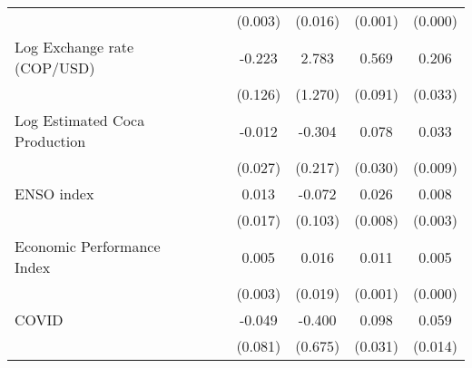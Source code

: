 \begin{tabular}{lcccccccc}
                    &                     &                     &                     &                     &     (0.003)         &     (0.016)         &     (0.001)         &     (0.000)         \\
\addlinespace
Log Exchange rate (COP/USD)&                     &                     &                     &                     &      -0.223         &       2.783\sym{*}  &       0.569\sym{***}&       0.206\sym{***}\\
                    &                     &                     &                     &                     &     (0.126)         &     (1.270)         &     (0.091)         &     (0.033)         \\
\addlinespace
Log Estimated Coca Production&                     &                     &                     &                     &      -0.012         &      -0.304         &       0.078\sym{**} &       0.033\sym{**} \\
                    &                     &                     &                     &                     &     (0.027)         &     (0.217)         &     (0.030)         &     (0.009)         \\
\addlinespace
ENSO index          &                     &                     &                     &                     &       0.013         &      -0.072         &       0.026\sym{**} &       0.008\sym{**} \\
                    &                     &                     &                     &                     &     (0.017)         &     (0.103)         &     (0.008)         &     (0.003)         \\
\addlinespace
Economic Performance Index&                     &                     &                     &                     &       0.005         &       0.016         &       0.011\sym{***}&       0.005\sym{***}\\
                    &                     &                     &                     &                     &     (0.003)         &     (0.019)         &     (0.001)         &     (0.000)         \\
\addlinespace
COVID               &                     &                     &                     &                     &      -0.049         &      -0.400         &       0.098\sym{**} &       0.059\sym{***}\\
                    &                     &                     &                     &                     &     (0.081)         &     (0.675)         &     (0.031)         &     (0.014)         \\

\end{tabular}
